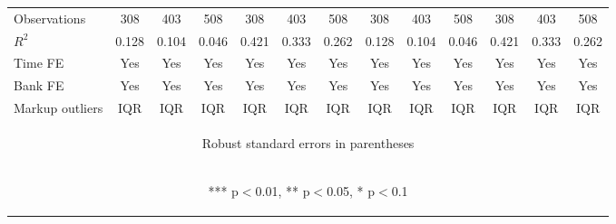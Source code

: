 \documentclass[]{article}
\begin{document}
\begin{center}
\begin{tabular}{lcccccccccccc}
Observations & 308 & 403 & 508 & 308 & 403 & 508 & 308 & 403 & 508 & 308 & 403 & 508 \\
$R^2$ & 0.128 & 0.104 & 0.046 & 0.421 & 0.333 & 0.262 & 0.128 & 0.104 & 0.046 & 0.421 & 0.333 & 0.262 \\
Time FE & Yes & Yes & Yes & Yes & Yes & Yes & Yes & Yes & Yes & Yes & Yes & Yes \\
Bank FE & Yes & Yes & Yes & Yes & Yes & Yes & Yes & Yes & Yes & Yes & Yes & Yes \\
 Markup outliers & IQR & IQR & IQR & IQR & IQR & IQR & IQR & IQR & IQR & IQR & IQR & IQR \\ \hline
\multicolumn{13}{c}{\begin{footnotesize} Robust standard errors in parentheses\end{footnotesize}} \\
\multicolumn{13}{c}{\begin{footnotesize} *** p$<$0.01, ** p$<$0.05, * p$<$0.1\end{footnotesize}} \\
\end{tabular}
\end{center}
\end{document}
